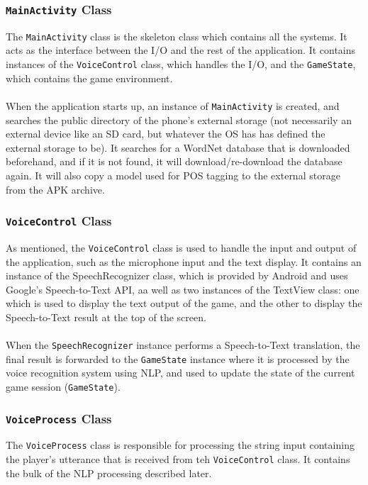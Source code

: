 \documentclass[12pt]{article}
\begin{document}
\subsubsection{\texttt{MainActivity} Class}

The \texttt{MainActivity} class is the skeleton class which contains all the systems. It acts as the interface between the I/O and the rest of the application. It contains instances of the \texttt{VoiceControl} class, which handles the I/O, and the \texttt{GameState}, which contains the game environment.
\\
\\
When the application starts up, an instance of \texttt{MainActivity} is created, and searches the public directory of the phone's external storage (not necessarily an external device like an SD card, but whatever the OS has has defined the external storage to be). It searches for a WordNet database that is downloaded beforehand, and if it is not found, it will download/re-download the database again. It will also copy a model used for POS tagging to the external storage from the APK archive.

\subsubsection{\texttt{VoiceControl} Class}

As mentioned, the \texttt{VoiceControl} class is used to handle the input and output of the application, such as the microphone input and the text display. It contains an instance of the SpeechRecognizer class, which is provided by Android and uses Google's Speech-to-Text API, aa well as two instances of the TextView class: one which is used to display the text output of the game, and the other to display the Speech-to-Text result at the top of the screen.
\\
\\
When the \texttt{SpeechRecognizer} instance performs a Speech-to-Text translation, the final result is forwarded to the \texttt{GameState} instance where it is processed by the voice recognition system using NLP, and used to update the state of the current game session (\texttt{GameState}).

\subsubsection{\texttt{VoiceProcess} Class}

The \texttt{VoiceProcess} class is responsible for processing the string input containing the player's utterance that is received from teh \texttt{VoiceControl} class. It contains the bulk of the NLP processing described later.
\end{document}

